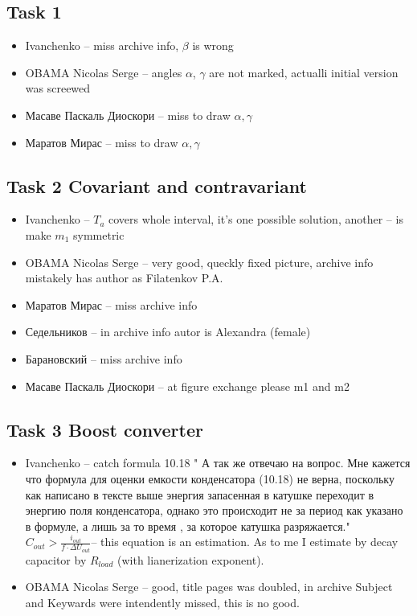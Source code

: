\documentclass[a4paper,landscape,11pt]{article}
\begin{document}
\subsection{Task 1}
\begin{itemize}
\item Ivanchenko -- miss archive info, $\beta$ is wrong
\item OBAMA Nicolas Serge -- angles $\alpha$, $\gamma$ are not marked, actualli initial version was screewed
\item Масаве Паскаль Диоскори -- miss to draw $\alpha,\gamma$
\item Маратов Мирас  -- miss to draw $\alpha,\gamma$ 
\end{itemize}

\subsection{Task 2 Covariant and contravariant}
\begin{itemize}
\item Ivanchenko -- $T_a$ covers whole interval, it's one possible solution, another -- is make $m_1$ symmetric
\item OBAMA Nicolas Serge -- very good, queckly fixed picture, archive info mistakely has author as Filatenkov P.A.
\item Маратов Мирас  --  miss archive info
\item Седельников -- in archive info autor is Alexandra (female)
\item Барановский  --  miss archive info
\item Масаве Паскаль Диоскори -- at figure exchange please m1 and m2
\end{itemize}

\subsection{Task 3 Boost converter}
\begin{itemize}
\item Ivanchenko -- catch formula 10.18 
" А так же отвечаю на вопрос. Мне кажется что формула для оценки емкости конденсатора (10.18) не верна, поскольку как написано в тексте выше энергия запасенная в катушке переходит в энергию поля конденсатора, однако это происходит не за период как указано в формуле, а лишь за то время , за которое катушка разряжается." 
$C_{out}> \frac{i_{out}}{f\cdot \Delta U_{out}}$-- this equation is an estimation.
As to me I estimate by decay capacitor by $R_{load}$ (with lianerization exponent).

\item OBAMA Nicolas Serge -- good, title pages was doubled, in archive Subject and Keywards were intendently missed, this is no good. 
\end{itemize}
\end{document}
